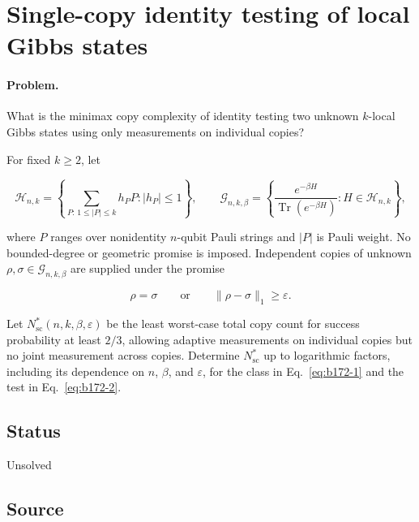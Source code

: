 \section{Single-copy identity testing of local Gibbs states}
\label{sec:op_b17234613637b07e}

\paragraph{Problem.}
What is the minimax copy complexity of identity testing two unknown $k$-local Gibbs states using only measurements on individual copies?

For fixed $k\geq2$, let

\begin{equation}
\mathcal H_{n,k}=\left\{\sum_{P:\,1\leq|P|\leq k}h_PP:|h_P|\leq1\right\},
\qquad
\mathcal G_{n,k,\beta}=\left\{\frac{e^{-\beta H}}{\operatorname{Tr}(e^{-\beta H})}:H\in\mathcal H_{n,k}\right\},
\label{eq:b172-1}
\end{equation}

where $P$ ranges over nonidentity $n$-qubit Pauli strings and $|P|$ is Pauli weight. No bounded-degree or geometric promise is imposed. Independent copies of unknown $\rho,\sigma\in\mathcal G_{n,k,\beta}$ are supplied under the promise

\begin{equation}
\rho=\sigma
\qquad\text{or}\qquad
\|\rho-\sigma\|_1\geq\varepsilon.
\label{eq:b172-2}
\end{equation}

Let $N^*_{\mathrm{sc}}(n,k,\beta,\varepsilon)$ be the least worst-case total copy count for success probability at least $2/3$, allowing adaptive measurements on individual copies but no joint measurement across copies. Determine $N^*_{\mathrm{sc}}$ up to logarithmic factors, including its dependence on $n$, $\beta$, and $\varepsilon$, for the class in Eq.~\eqref{eq:b172-1} and the test in Eq.~\eqref{eq:b172-2}.

\subsection*{Status}

Unsolved

\subsection*{Source}

